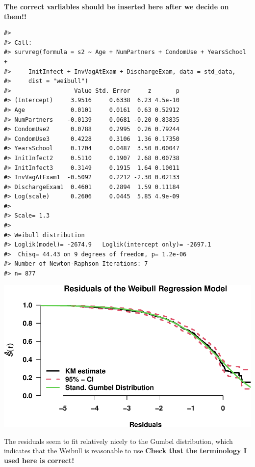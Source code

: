 \documentclass[
]{article}
\begin{document}
\textbf{The correct varliables should be inserted here after we decide on them!!}

\begin{verbatim}
#> 
#> Call:
#> survreg(formula = s2 ~ Age + NumPartners + CondomUse + YearsSchool + 
#>     InitInfect + InvVagAtExam + DischargeExam, data = std_data, 
#>     dist = "weibull")
#>                  Value Std. Error     z       p
#> (Intercept)     3.9516     0.6338  6.23 4.5e-10
#> Age             0.0101     0.0161  0.63 0.52912
#> NumPartners    -0.0139     0.0681 -0.20 0.83835
#> CondomUse2      0.0788     0.2995  0.26 0.79244
#> CondomUse3      0.4228     0.3106  1.36 0.17350
#> YearsSchool     0.1704     0.0487  3.50 0.00047
#> InitInfect2     0.5110     0.1907  2.68 0.00738
#> InitInfect3     0.3149     0.1915  1.64 0.10011
#> InvVagAtExam1  -0.5092     0.2212 -2.30 0.02133
#> DischargeExam1  0.4601     0.2894  1.59 0.11184
#> Log(scale)      0.2606     0.0445  5.85 4.9e-09
#> 
#> Scale= 1.3 
#> 
#> Weibull distribution
#> Loglik(model)= -2674.9   Loglik(intercept only)= -2697.1
#>  Chisq= 44.43 on 9 degrees of freedom, p= 1.2e-06 
#> Number of Newton-Raphson Iterations: 7 
#> n= 877
\end{verbatim}

\includegraphics{practical_files/figure-latex/unnamed-chunk-8-1.pdf}

The residuals seem to fit relatively nicely to the Gumbel distribution, which indicates that the Weibull is reasonable to use \textbf{Check that the terminology I used here is correct!}
\end{document}
